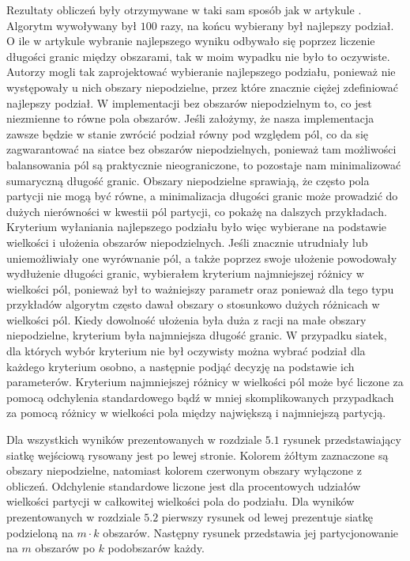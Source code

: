 Rezultaty obliczeń były otrzymywane w taki sam sposób jak w artykule \cite{1364754}.
Algorytm wywoływany był $100$ razy, na końcu wybierany był najlepszy podział.
O ile w artykule \cite{1364754} wybranie najlepszego wyniku odbywało się poprzez liczenie długości granic między obszarami,
tak w moim wypadku nie było to oczywiste.
Autorzy \cite{1364754} mogli tak zaprojektować wybieranie najlepszego podziału, ponieważ nie występowały u nich
obszary niepodzielne, przez które znacznie ciężej zdefiniować najlepszy podział.
W implementacji bez obszarów niepodzielnym to, co jest niezmienne to równe pola obszarów.
Jeśli założymy, że nasza implementacja zawsze będzie w stanie zwrócić podział równy pod względem pól,
co da się zagwarantować na siatce bez obszarów niepodzielnych, ponieważ tam możliwości balansowania
pól są praktycznie nieograniczone, to pozostaje nam minimalizować sumaryczną długość granic.
Obszary niepodzielne sprawiają, że często pola partycji nie mogą być równe, a minimalizacja długości granic może
prowadzić do dużych nierówności w kwestii pól partycji, co pokażę na dalszych przykładach.
Kryterium wyłaniania najlepszego podziału było więc wybierane na podstawie wielkości i ułożenia obszarów niepodzielnych.
Jeśli znacznie utrudniały lub uniemożliwiały one wyrównanie pól, a także poprzez swoje ułożenie powodowały wydłużenie długości granic,
wybierałem kryterium najmniejszej różnicy w wielkości pól, ponieważ był to ważniejszy parametr oraz
ponieważ dla tego typu przykładów algorytm często dawał obszary o stosunkowo dużych różnicach w wielkości pól.
Kiedy dowolność ułożenia była duża z racji na małe obszary niepodzielne, kryterium była najmniejsza długość granic.
W przypadku siatek, dla których wybór kryterium nie był oczywisty można wybrać podział dla każdego kryterium osobno,
a następnie podjąć decyzję na podstawie ich parameterów.
Kryterium najmniejszej różnicy w wielkości pól może być liczone za pomocą odchylenia standardowego bądź w mniej
skomplikowanych przypadkach
za pomocą różnicy w wielkości pola między największą i najmniejszą partycją.

Dla wszystkich wyników prezentowanych w rozdziale $5.1$ rysunek przedstawiający siatkę wejściową rysowany jest po lewej stronie.
Kolorem żółtym zaznaczone są obszary niepodzielne, natomiast kolorem czerwonym obszary wyłączone z obliczeń.
Odchylenie standardowe liczone jest dla procentowych udziałów wielkości partycji w całkowitej wielkości pola do podziału.
Dla wyników prezentowanych w rozdziale $5.2$ pierwszy rysunek od lewej prezentuje siatkę podzieloną na $m \cdot k$ obszarów.
Następny rysunek przedstawia jej partycjonowanie na $m$ obszarów po $k$ podobszarów każdy.
\vspace{-5mm}